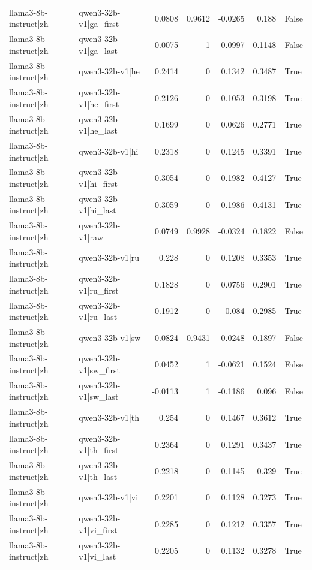 \begin{table}
\begin{tabular}{l l r r r r l}
llama3-8b-instruct|zh & qwen3-32b-v1|ga_first & 0.0808 & 0.9612 & -0.0265 & 0.188 & False \\
llama3-8b-instruct|zh & qwen3-32b-v1|ga_last & 0.0075 & 1 & -0.0997 & 0.1148 & False \\
llama3-8b-instruct|zh & qwen3-32b-v1|he & 0.2414 & 0 & 0.1342 & 0.3487 & True \\
llama3-8b-instruct|zh & qwen3-32b-v1|he_first & 0.2126 & 0 & 0.1053 & 0.3198 & True \\
llama3-8b-instruct|zh & qwen3-32b-v1|he_last & 0.1699 & 0 & 0.0626 & 0.2771 & True \\
llama3-8b-instruct|zh & qwen3-32b-v1|hi & 0.2318 & 0 & 0.1245 & 0.3391 & True \\
llama3-8b-instruct|zh & qwen3-32b-v1|hi_first & 0.3054 & 0 & 0.1982 & 0.4127 & True \\
llama3-8b-instruct|zh & qwen3-32b-v1|hi_last & 0.3059 & 0 & 0.1986 & 0.4131 & True \\
llama3-8b-instruct|zh & qwen3-32b-v1|raw & 0.0749 & 0.9928 & -0.0324 & 0.1822 & False \\
llama3-8b-instruct|zh & qwen3-32b-v1|ru & 0.228 & 0 & 0.1208 & 0.3353 & True \\
llama3-8b-instruct|zh & qwen3-32b-v1|ru_first & 0.1828 & 0 & 0.0756 & 0.2901 & True \\
llama3-8b-instruct|zh & qwen3-32b-v1|ru_last & 0.1912 & 0 & 0.084 & 0.2985 & True \\
llama3-8b-instruct|zh & qwen3-32b-v1|sw & 0.0824 & 0.9431 & -0.0248 & 0.1897 & False \\
llama3-8b-instruct|zh & qwen3-32b-v1|sw_first & 0.0452 & 1 & -0.0621 & 0.1524 & False \\
llama3-8b-instruct|zh & qwen3-32b-v1|sw_last & -0.0113 & 1 & -0.1186 & 0.096 & False \\
llama3-8b-instruct|zh & qwen3-32b-v1|th & 0.254 & 0 & 0.1467 & 0.3612 & True \\
llama3-8b-instruct|zh & qwen3-32b-v1|th_first & 0.2364 & 0 & 0.1291 & 0.3437 & True \\
llama3-8b-instruct|zh & qwen3-32b-v1|th_last & 0.2218 & 0 & 0.1145 & 0.329 & True \\
llama3-8b-instruct|zh & qwen3-32b-v1|vi & 0.2201 & 0 & 0.1128 & 0.3273 & True \\
llama3-8b-instruct|zh & qwen3-32b-v1|vi_first & 0.2285 & 0 & 0.1212 & 0.3357 & True \\
llama3-8b-instruct|zh & qwen3-32b-v1|vi_last & 0.2205 & 0 & 0.1132 & 0.3278 & True \\

\end{tabular}
\end{table}
